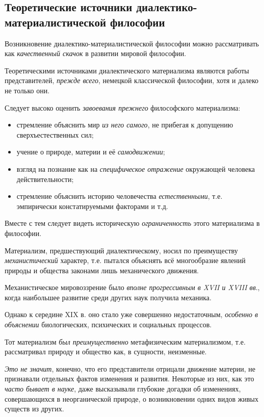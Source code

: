 \documentclass[a4paper,14pt,russian]{extreport}
\begin{document}
\subsection{Теоретические источники диалектико-материалистической философии}

Возникновение диалектико-материалистической философии можно рассматривать как \emph{качественный скачок} в развитии мировой философии.

Теоретическими источниками диалектического материализма являются работы представителей, \emph{прежде всего}, немецкой классической философии, хотя и далеко не только они.

Следует высоко оценить \emph{завоевания прежнего} философского материализма:

\begin{itemize}
\item стремление объяснить мир \emph{из него самого}, не прибегая к допущению сверхъестественных сил;
\item учение о природе, материи и её \emph{самодвижении};
\item взгляд на познание как на \emph{специфическое отражение} окружающей человека действительности;
\item стремление объяснить историю человечества \emph{естественными}, т.е. эмпирически констатируемыми факторами и т.д.
\end{itemize}

Вместе с тем следует видеть историческую \emph{ограниченность} этого материализма в философии.

Материализм, предшествующий диалектическому, носил по преимуществу \emph{механистический} характер, т.е. пытался объяснять всё многообразие явлений природы и общества законами лишь механического движения.

Механистическое мировоззрение было \emph{вполне прогрессивным в XVII и XVIII вв}., когда наибольшее развитие среди других наук получила механика.

Однако к середине XIX в. оно стало уже совершенно недостаточным, \emph{особенно в объяснении} биологических, психических и социальных процессов.

Тот материализм \emph{был преимущественно} метафизическим материализмом, т.е. рассматривал природу и общество как, в сущности, неизменные.

\emph{Это не значит}, конечно, что его представители отрицали движение материи, не признавали отдельных фактов изменения и развития. Некоторые из них, как это \emph{часто бывает в науке}, даже высказывали глубокие догадки об изменениях, совершающихся в неорганической природе, о возникновении одних видов живых существ из других.
\end{document}
